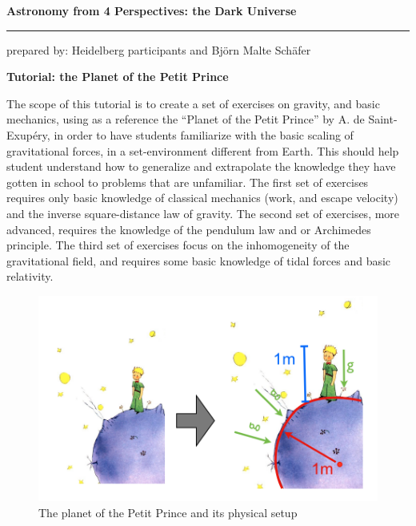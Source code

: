 \documentclass[a4paper,12pt]{article}
\newcommand{\HRule}{\rule{\linewidth}{0.3mm}}
\begin{document}
\pagestyle{empty}

\begin{center}
\LARGE \textbf{Astronomy from 4 Perspectives: the Dark Universe}
\HRule
\end{center}
\begin{flushright}
prepared by: Heidelberg participants and Bj{\"o}rn Malte Sch{\"a}fer
\end{flushright}
\begin{center}
{\Large \textbf{Tutorial: the Planet of the Petit Prince}}
\end{center}
\vspace{5mm}
The scope of this tutorial is to create a set of exercises on
gravity, and basic mechanics, using as a reference the ``Planet of the
Petit Prince'' by A. de Saint-Exup{\'e}ry, in order to have students
familiarize with the basic scaling of gravitational forces, in a
set-environment different from Earth. This should help student
understand how to generalize and extrapolate the knowledge they have
gotten in school to problems that are unfamiliar. The first set of
exercises requires only basic knowledge of classical mechanics (work,
and escape velocity) and the inverse square-distance law of
gravity. The second set of exercises, more advanced, requires the
knowledge of the pendulum law and or Archimedes principle. The third
set of exercises focus on the inhomogeneity of the gravitational field,
and requires some basic knowledge of tidal forces and basic
relativity.

\begin{figure}[h]
\includegraphics[width=16cm]{figures/figure_petit_prince.png}
\caption{The planet of the Petit Prince and its physical setup}
\end{figure}
\end{document}
